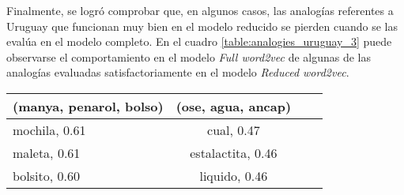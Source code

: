 Finalmente, se logró comprobar que, en algunos casos, las analogías referentes a
Uruguay que funcionan muy bien en el modelo reducido se pierden cuando se
las evalúa en el modelo completo. En el cuadro \ref{table:analogies_uruguay_3} puede observarse el
comportamiento en el modelo \textit{Full word2vec} de algunas de las analogías evaluadas
satisfactoriamente en el modelo \textit{Reduced word2vec}.

\begin{table*}[ht]
    \centering
    \begin{tabular}{lccc}
        \hline
        (manya, penarol, bolso) & (ose, agua, ancap)\\
        \hline
        mochila, 0.61 & cual, 0.47\\
        maleta, 0.61 & estalactita, 0.46\\
        bolsito, 0.60 & liquido, 0.46\\
        \hline
    \end{tabular}
    \caption{Analogías relacionadas a Uruguay con modelo completo.}
    \label{table:analogies_uruguay_3}
\end{table*}
